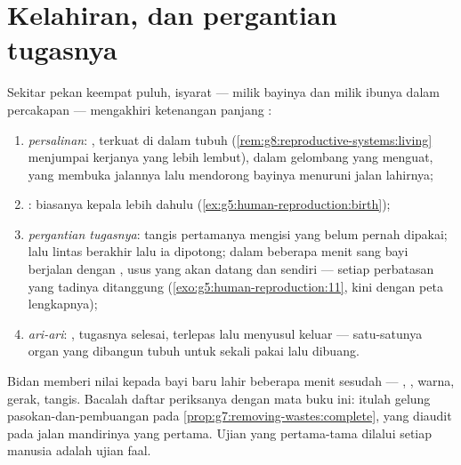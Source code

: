 \section{Kelahiran, dan pergantian tugasnya}

\begin{proposition}\label{prop:g8:from-egg-to-birth:birth}
Sekitar pekan keempat puluh, isyarat  --- milik bayinya
dan milik ibunya dalam percakapan --- mengakhiri ketenangan
panjang :
\begin{enumerate}
  \item \emph{persalinan}: ,  terkuat di dalam
        tubuh (\cref{rem:g8:reproductive-systems:living}
        menjumpai kerjanya yang lebih lembut), 
        dalam gelombang yang menguat, yang membuka jalannya
        lalu mendorong bayinya menuruni jalan lahirnya;
  \item \emph{}: biasanya kepala lebih dahulu
        (\cref{ex:g5:human-reproduction:birth});
  \item \emph{pergantian tugasnya}: tangis pertamanya
        mengisi  yang belum pernah dipakai; lalu
        lintas  berakhir lalu ia dipotong;
        dalam beberapa menit sang bayi berjalan dengan
        , usus yang akan datang dan 
        sendiri --- setiap perbatasan yang tadinya ditanggung
         (\cref{exo:g5:human-reproduction:11},
        kini dengan peta lengkapnya);
  \item \emph{ari-ari}: , tugasnya selesai,
        terlepas lalu menyusul keluar --- satu-satunya organ
        yang dibangun tubuh untuk sekali pakai lalu dibuang.
\end{enumerate}
\end{proposition}
\admitted

\begin{example}\label{ex:g8:from-egg-to-birth:audit}
Bidan memberi nilai kepada bayi baru lahir beberapa menit
sesudah  --- , , warna,
gerak, tangis. Bacalah daftar periksanya dengan mata buku
ini: itulah gelung pasokan-dan-pembuangan pada
\cref{prop:g7:removing-wastes:complete}, yang diaudit pada
jalan mandirinya yang pertama. Ujian yang pertama-tama
dilalui setiap manusia adalah ujian faal.
\end{example}

